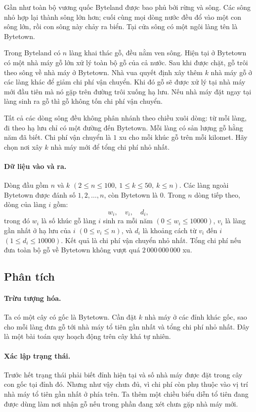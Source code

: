 \documentclass[11pt]{article}
\begin{document}
Gần như toàn bộ vương quốc Byteland được bao phủ bởi rừng và sông. Các sông
nhỏ hợp lại thành sông lớn hơn; cuối cùng mọi dòng nước đều đổ vào một con
sông lớn, rồi con sông này chảy ra biển. Tại cửa sông có một ngôi làng tên là
Bytetown.

Trong Byteland có \(n\) làng khai thác gỗ, đều nằm ven sông. Hiện tại ở
Bytetown có một nhà máy gỗ lớn xử lý toàn bộ gỗ của cả nước. Sau khi được
chặt, gỗ trôi theo sông về nhà máy ở Bytetown. Nhà vua quyết định xây thêm
\(k\) nhà máy gỗ ở các làng khác để giảm chi phí vận chuyển. Khi đó gỗ sẽ
được xử lý tại nhà máy mới đầu tiên mà nó gặp trên đường trôi xuống hạ lưu.
Nếu nhà máy đặt ngay tại làng sinh ra gỗ thì gỗ không tốn chi phí vận chuyển.

Tất cả các dòng sông đều không phân nhánh theo chiều xuôi dòng: từ mỗi làng,
đi theo hạ lưu chỉ có một đường đến Bytetown. Mỗi làng có sản lượng gỗ hằng
năm đã biết. Chi phí vận chuyển là \(1\) xu cho mỗi khúc gỗ trên mỗi kilomet.
Hãy chọn nơi xây \(k\) nhà máy mới để tổng chi phí nhỏ nhất.

\paragraph{Dữ liệu vào và ra.}
Dòng đầu gồm \(n\) và \(k\)
\((2\le n\le 100,\ 1\le k\le 50,\ k\le n)\). Các làng ngoài Bytetown được
đánh số \(1,2,\ldots,n\), còn Bytetown là \(0\). Trong \(n\) dòng tiếp theo,
dòng của làng \(i\) gồm:
\[
  w_i,\quad v_i,\quad d_i,
\]
trong đó \(w_i\) là số khúc gỗ làng \(i\) sinh ra mỗi năm
\((0\le w_i\le 10000)\), \(v_i\) là làng gần nhất ở hạ lưu của \(i\)
\((0\le v_i\le n)\), và \(d_i\) là khoảng cách từ \(v_i\) đến \(i\)
\((1\le d_i\le 10000)\). Kết quả là chi phí vận chuyển nhỏ nhất. Tổng chi phí
nếu đưa toàn bộ gỗ về Bytetown không vượt quá \(2\,000\,000\,000\) xu.

\subsection{Phân tích}

\paragraph{Trừu tượng hóa.}
Ta có một cây có gốc là Bytetown. Cần đặt \(k\) nhà máy ở các đỉnh khác gốc,
sao cho mỗi làng đưa gỗ tới nhà máy tổ tiên gần nhất và tổng chi phí nhỏ
nhất. Đây là một bài toán quy hoạch động trên cây khá tự nhiên.

\paragraph{Xác lập trạng thái.}
Trước hết trạng thái phải biết đỉnh hiện tại và số nhà máy được đặt trong cây
con gốc tại đỉnh đó. Nhưng như vậy chưa đủ, vì chi phí còn phụ thuộc vào vị
trí nhà máy tổ tiên gần nhất ở phía trên. Ta thêm một chiều biểu diễn tổ tiên
đang được dùng làm nơi nhận gỗ nếu trong phần đang xét chưa gặp nhà máy mới.
\end{document}
